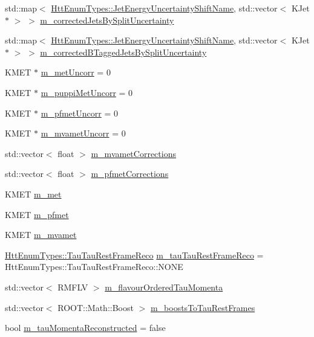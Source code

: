\begin{DoxyCompactItemize}
std::map$<$ \hyperlink{classHttEnumTypes_a6d52b15105995df93610454d88c598f0}{HttEnumTypes::JetEnergyUncertaintyShiftName}, std::vector$<$ KJet $\ast$ $>$ $>$ \hyperlink{classHttProduct_a37927d009e750a74a32b77e1b3431fbe}{m\_\-correctedJetsBySplitUncertainty}
\item 
std::map$<$ \hyperlink{classHttEnumTypes_a6d52b15105995df93610454d88c598f0}{HttEnumTypes::JetEnergyUncertaintyShiftName}, std::vector$<$ KJet $\ast$ $>$ $>$ \hyperlink{classHttProduct_aba1b83caaf97fb12f47642179f8a3dd6}{m\_\-correctedBTaggedJetsBySplitUncertainty}
\item 
KMET $\ast$ \hyperlink{classHttProduct_a262e1f83347405eaad1b7f4324f1ca43}{m\_\-metUncorr} = 0
\item 
KMET $\ast$ \hyperlink{classHttProduct_aa787c5a62f9e8fcff5ba469b877864aa}{m\_\-puppiMetUncorr} = 0
\item 
KMET $\ast$ \hyperlink{classHttProduct_a9c2604be85c44fc57f7fa3fd067a9a8f}{m\_\-pfmetUncorr} = 0
\item 
KMET $\ast$ \hyperlink{classHttProduct_a45f94abd585fbce86a75e170bd5e17d9}{m\_\-mvametUncorr} = 0
\item 
std::vector$<$ float $>$ \hyperlink{classHttProduct_a17c2bf4e38deeba8621905cf106e334d}{m\_\-mvametCorrections}
\item 
std::vector$<$ float $>$ \hyperlink{classHttProduct_a8da5000e9a19e09d4495b8d81d4c67c9}{m\_\-pfmetCorrections}
\item 
KMET \hyperlink{classHttProduct_a7c4828e5053357081c0b6013762913cd}{m\_\-met}
\item 
KMET \hyperlink{classHttProduct_aa99f9a9c423fc8188938dcc0155da4c4}{m\_\-pfmet}
\item 
KMET \hyperlink{classHttProduct_a44f387057d5dafe967b68fd5eb58a79f}{m\_\-mvamet}
\item 
\hyperlink{classHttEnumTypes_add21b4b1cefbea05ecb244d1b72f52e7}{HttEnumTypes::TauTauRestFrameReco} \hyperlink{classHttProduct_af34a6998b5fe3ae490f3e4be430b9333}{m\_\-tauTauRestFrameReco} = HttEnumTypes::TauTauRestFrameReco::NONE
\item 
std::vector$<$ RMFLV $>$ \hyperlink{classHttProduct_a1927121e20f6b91f82993722074198c0}{m\_\-flavourOrderedTauMomenta}
\item 
std::vector$<$ ROOT::Math::Boost $>$ \hyperlink{classHttProduct_ad47b7fcac7b589b6a4f9a3f8f6816388}{m\_\-boostsToTauRestFrames}
\item 
bool \hyperlink{classHttProduct_ab784e7805f945bedf6e2cc3ee39f7112}{m\_\-tauMomentaReconstructed} = false

\end{DoxyCompactItemize}
